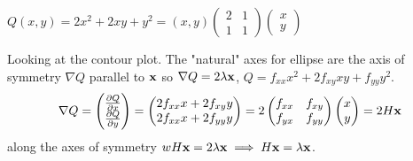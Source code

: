 \documentclass[10pt, a4paper]{article}
\begin{document}
\begin{example}
    $Q(x, y) = 2x ^ 2 + 2xy + y ^ 2 = (x, y)\begin{pmatrix}
        2 & 1 \\ 1 & 1
    \end{pmatrix}\begin{pmatrix}
        x \\ y
    \end{pmatrix}$

    Looking at the contour plot.
    The "natural" axes for ellipse are the axis of symmetry $\nabla Q$ parallel to $\mbf{x}$ so $\nabla Q = 2\lambda\mbf{x}$,
    $Q = f_{xx}x ^ 2 + 2f_{xy}xy + f_{yy}y ^ 2$.
    \[
    \nabla Q = \begin{pmatrix}
        \pd[Q]{x} \\
        \pd[Q]{y}
    \end{pmatrix} = \begin{pmatrix}
        2f_{xx}x + 2f_{xy}y \\
        2f_{xx}x + 2f_{yy}y
    \end{pmatrix} = 2\begin{pmatrix}
        f_{xx} & f_{xy} \\
        f_{yx} & f_{yy}
    \end{pmatrix}\begin{pmatrix}
        x \\ y
    \end{pmatrix} = 2H\mbf{x}
    \]
    along the axes of symmetry $wH\mbf{x} = 2\lambda\mbf{x} \implies H\mbf{x} = \lambda\mbf{x}$.
\end{example}
\end{document}
